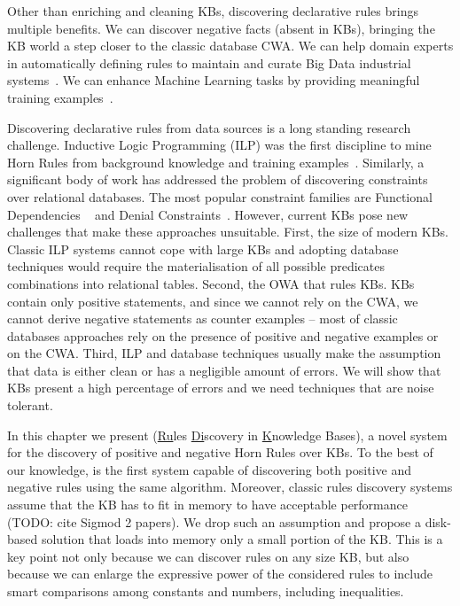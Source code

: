 Other than enriching and cleaning KBs, discovering declarative rules brings multiple benefits. We can discover negative facts (absent in KBs), bringing the KB world a step closer to the classic database CWA. We can help domain experts in automatically defining rules to maintain and curate Big Data industrial systems~\cite{gc2015big}. We can enhance Machine Learning tasks by providing meaningful training examples~\cite{richardson2006markov,shin2015incremental}.

Discovering declarative rules from data sources is a long standing research challenge. Inductive Logic Programming (ILP) was the first discipline to mine Horn Rules from background knowledge and training examples~\cite{muggleton1994inductive}. Similarly, a significant body of work has addressed the problem of discovering constraints over relational databases. The most popular constraint families are Functional Dependencies ~\cite{abiteboul1995foundations,huhtala1999tane,wyss2001fastfds} and Denial Constraints~\cite{chu2013discovering}. However, current KBs pose new challenges that make these approaches unsuitable. First, the size of modern KBs. Classic ILP systems cannot cope with large KBs and adopting database techniques would require the materialisation of all possible predicates combinations into relational tables. Second, the OWA that rules KBs. KBs contain only positive statements, and since we cannot rely on the CWA, we cannot derive negative statements as counter examples -- most of classic databases approaches rely on the presence of positive and negative examples or on the CWA. Third, ILP and database techniques usually make the assumption that data is either clean or has a negligible amount of errors. We will show that KBs present a high percentage of errors and we need techniques that are noise tolerant.


 In this chapter we present \krd (\underline{Ru}les \underline{Di}scovery in \underline{K}nowledge Bases), a novel system for the discovery of positive and negative Horn Rules over KBs. To the best of our knowledge, \krd is the first system capable of discovering both positive and negative rules using the same algorithm. Moreover, classic rules discovery systems assume that the KB has to fit in memory to have acceptable performance~\cite{abedjan2014amending,galarraga2015fast} (TODO: cite Sigmod 2 papers). We drop such an assumption and propose a disk-based solution that loads into memory only a small portion of the KB. This is a key point not only because we can discover rules on any size KB, but also because we can enlarge the expressive power of the considered rules to include smart comparisons among constants and numbers, including inequalities.

